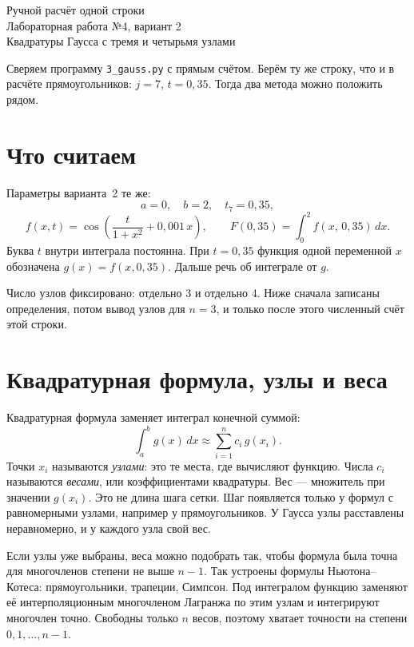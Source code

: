 \documentclass[11pt,a4paper]{article}
\begin{document}
\begin{center}
{\Large Ручной расчёт одной строки}\\[0.4em]
{\large Лабораторная работа №4, вариант 2}\\[0.2em]
Квадратуры Гаусса с тремя и четырьмя узлами
\end{center}

Сверяем программу \texttt{3\_gauss.py} с прямым счётом.
Берём ту же строку, что и в расчёте прямоугольников: \(j = 7\), \(t = 0{,}35\).
Тогда два метода можно положить рядом.

\section*{Что считаем}

Параметры варианта~2 те же:
\[
a = 0,\quad b = 2,\quad
t_{7} = 0{,}35,
\]
\[
f(x, t) = \cos\left(\frac{t}{1 + x^{2}} + 0{,}001\, x\right),
\qquad
F(0{,}35) = \int_{0}^{2} f(x,\, 0{,}35)\, dx.
\]
Буква \(t\) внутри интеграла постоянна. При \(t = 0{,}35\) функция одной переменной \(x\)
обозначена \(g(x) = f(x, 0{,}35)\). Дальше речь об интеграле от \(g\).

Число узлов фиксировано: отдельно 3 и отдельно 4.
Ниже сначала записаны определения, потом вывод узлов для \(n = 3\),
и только после этого численный счёт этой строки.

\section*{Квадратурная формула, узлы и веса}

Квадратурная формула заменяет интеграл конечной суммой:
\[
\int_{a}^{b} g(x)\, dx \approx \sum_{i=1}^{n} c_{i}\, g(x_{i}).
\]
Точки \(x_{i}\) называются \emph{узлами}: это те места, где вычисляют функцию.
Числа \(c_{i}\) называются \emph{весами}, или коэффициентами квадратуры.
Вес --- множитель при значении \(g(x_{i})\). Это не длина шага сетки.
Шаг появляется только у формул с равномерными узлами, например у прямоугольников.
У Гаусса узлы расставлены неравномерно, и у каждого узла свой вес.

Если узлы уже выбраны, веса можно подобрать так, чтобы формула была точна
для многочленов степени не выше \(n - 1\). Так устроены формулы Ньютона--Котеса:
прямоугольники, трапеции, Симпсон. Под интегралом функцию заменяют
её интерполяционным многочленом Лагранжа по этим узлам и интегрируют многочлен точно.
Свободны только \(n\) весов, поэтому хватает точности на степени \(0, 1, \ldots, n - 1\).
\end{document}
